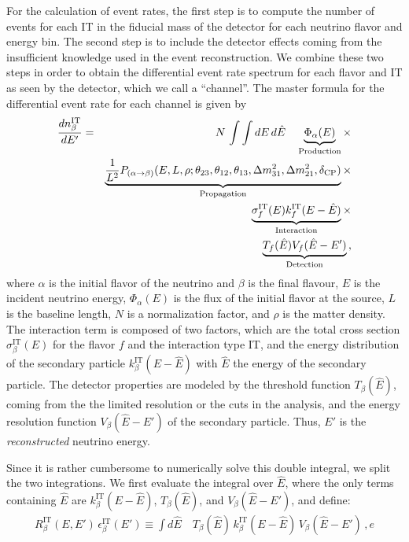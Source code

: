 For the calculation of event rates, the first step is to compute the number of
events for each IT in the fiducial mass of the detector for each 
neutrino flavor and energy bin. The second step is to include the detector 
effects coming from
the insufficient knowledge used in the event reconstruction. We combine these
two steps in order to obtain the differential event rate spectrum for each
flavor and IT as seen by the detector, which we call a ``channel''. 
The master formula for the differential event rate for each channel 
is given by
\begin{eqnarray}
\label{eq:master_event}
\frac{dn_{\beta}^{\text{IT}}}{dE'}=&&N\,\int \int dE\,d\hat{E}\quad
\underbrace{\Phi_{\alpha} (E)}_{\mathrm{Production}} \times \nonumber\\
&&\underbrace{\frac{1}{L^2} P_{(\alpha\rightarrow\beta)}(E,L,\rho;\theta_{23},
\theta_{12},\theta_{13},
\Delta m^2_{31},\Delta m^2_{21},\delta_{\mathrm{CP}})}_{\mathrm{Propagation}}
\times \nonumber \\ &&\underbrace{\sigma^{\text{IT}}_f(E)
k_f^{\text{IT}}(E-\hat{E})}_{\mathrm{Interaction}} \times \nonumber \\
&&\underbrace{ T_f(\hat{E}) V_f(\hat{E}-E')}_{\mathrm{Detection}}\,,
\end{eqnarray}
where $\alpha$ is the initial flavor of the neutrino and 
$\beta$ is the final flavour, 
$E$ is the incident neutrino energy, $\Phi_{\alpha} (E)$ is the flux of the 
initial flavor at the
source, $L$ is the baseline length, $N$ is a normalization factor, and 
$\rho$ is the matter density. The interaction term is composed of 
two factors, which are the total cross section 
$\sigma^{\text{IT}}_\beta(E)$ for the flavor $f$ and
the interaction type IT, and the energy distribution of the 
secondary particle $k_\beta^{\text{IT}}(E-\hat{E})$ with 
$\hat{E}$ the energy of the secondary particle. The detector properties are 
modeled by the threshold function $T_\beta(\hat{E})$, coming from the the 
limited resolution or the cuts in the analysis, and the energy resolution 
function $V_\beta(\hat{E}-E')$ of the secondary particle. Thus, $E'$ is the 
{\em reconstructed} neutrino energy.

Since it is rather cumbersome to numerically solve this double integral,
we split the two integrations. We first evaluate the integral over
$\hat{E}$, where the only terms containing $\hat{E}$ are
$k_\beta^{\text{IT}}(E-\hat{E})$,  $ T_\beta(\hat{E})$, and 
$ V_\beta(\hat{E}-E')$, and define:
\begin{eqnarray}
\label{eq:e_res} 
R_\beta^{\text{IT}}(E,E')\,\epsilon_\beta^{\text{IT}}(E')
 \equiv
\int d\hat{E} \quad T_\beta(\hat{E})\,k_\beta^{\text{IT}}(E-\hat{E})
\,V_\beta(\hat{E}-E')\,, 
e\end{eqnarray}


